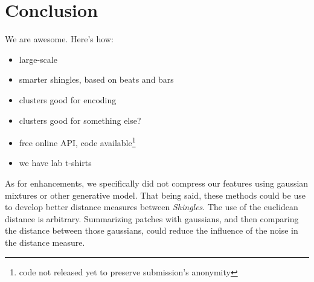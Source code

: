 \documentclass{article}
\begin{document}
\section{Conclusion}
We are awesome. Here's how:
\begin{itemize}
\item large-scale
\item smarter shingles, based on beats and bars
\item clusters good for encoding
\item clusters good for something else?
\item free online API, code available\footnote{code not released yet to preserve 
submission's anonymity}
\item we have lab t-shirts
\end{itemize}

As for enhancements, we specifically did not compress our features using
gaussian mixtures or other generative model. That being said, these methods
could be use to develop better distance measures between \textit{Shingles}.
The use of the euclidean distance is arbitrary. Summarizing patches
with gaussians, and then comparing the distance between those gaussians,
could reduce the influence of the noise in the distance measure.



\small




\end{document}
